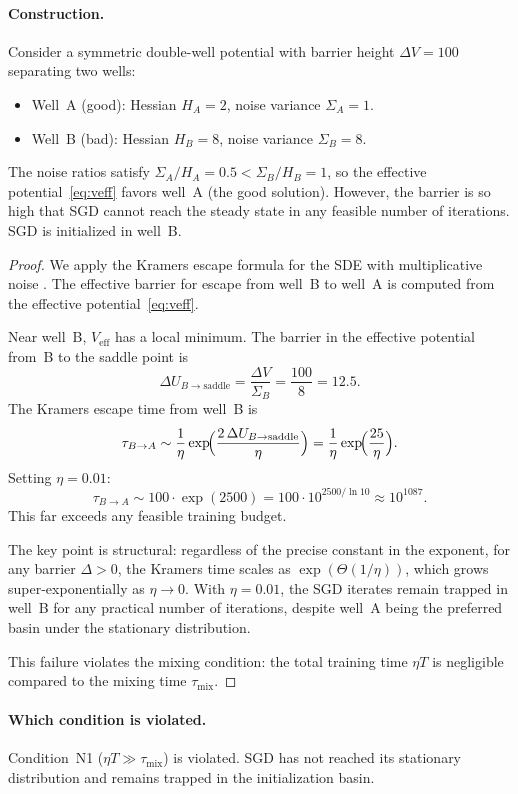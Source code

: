 \documentclass[11pt,a4paper]{article}
\newcommand{\Veff}{V_{\mathrm{eff}}}
\begin{document}
\paragraph{Construction.}
Consider a symmetric double-well potential with barrier height $\Delta V = 100$
separating two wells:
\begin{itemize}[nosep]
  \item Well~A (good): Hessian $H_A = 2$, noise variance $\Sigma_A = 1$.
  \item Well~B (bad): Hessian $H_B = 8$, noise variance $\Sigma_B = 8$.
\end{itemize}
The noise ratios satisfy $\Sigma_A/H_A = 0.5 < \Sigma_B/H_B = 1$, so
the effective potential~\eqref{eq:veff} favors well~A (the good solution).
However, the barrier is so high that SGD cannot reach the steady state in
any feasible number of iterations.
SGD is initialized in well~B.

\begin{proof}
We apply the Kramers escape formula for the SDE with multiplicative noise
\citep{kramers1940brownian}.  The effective barrier for escape from well~B
to well~A is computed from the effective potential~\eqref{eq:veff}.

Near well~B, $\Veff$ has a local minimum.  The barrier in the effective
potential from~B to the saddle point is
\[
  \Delta U_{B\to\mathrm{saddle}}
  = \frac{\Delta V}{\Sigma_B} = \frac{100}{8} = 12.5.
\]
The Kramers escape time from well~B is
\[
  \tau_{B\to A}
  \sim \frac{1}{\eta}\exp\!\Bigl(\frac{2\,\Delta U_{B\to\mathrm{saddle}}}{\eta}\Bigr)
  = \frac{1}{\eta}\exp\!\Bigl(\frac{25}{\eta}\Bigr).
\]
Setting $\eta = 0.01$:
\[
  \tau_{B\to A}
  \sim 100\cdot\exp(2500)
  = 100\cdot 10^{2500/\ln 10}
  \approx 10^{1087}.
\]
This far exceeds any feasible training budget.

The key point is structural: regardless of the precise constant in the
exponent, for any barrier $\Delta > 0$, the Kramers time scales as
$\exp(\Theta(1/\eta))$, which grows super-exponentially as $\eta\to 0$.
With $\eta = 0.01$, the SGD iterates remain trapped in well~B for any
practical number of iterations, despite well~A being the preferred basin
under the stationary distribution.

This failure violates the mixing condition: the total training time $\eta T$
is negligible compared to the mixing time $\tau_{\mathrm{mix}}$.
\end{proof}

\paragraph{Which condition is violated.}
Condition~N1 ($\eta T \gg \tau_{\mathrm{mix}}$) is violated.
SGD has not reached its stationary distribution and remains trapped in the
initialization basin.
\end{document}
